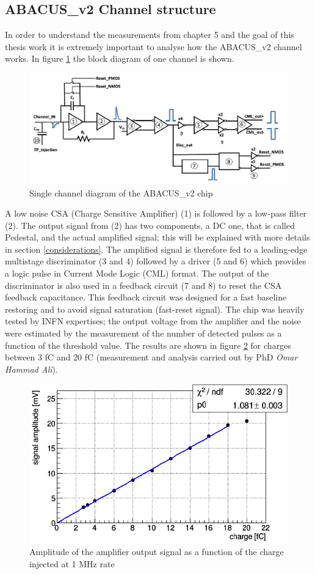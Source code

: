 \subsection{ABACUS\_v2 Channel structure}
In order to understand the measurements from chapter 5 and the goal of this thesis work it is extremely important to analyse how the ABACUS\_v2 channel works.
In figure \ref{fig:abacuschannel} the block diagram of one channel is shown.
\begin{figure}[H]
	\centering
	\includegraphics[width=0.8\linewidth]{IMG/ch2/Abacus_channel.png}
	\caption{Single channel diagram of the ABACUS\_v2 chip}
	\label{fig:abacuschannel}
\end{figure}
\noindent A low noise CSA (Charge Sensitive Amplifier) (1) is followed by a low-pass filter (2).
The output signal from (2) has two components, a DC one, that is called Pedestal, and the actual amplified signal; this will be explained with more details in section \ref{considerations}.
The amplified signal is therefore fed to a leading-edge multistage discriminator (3 and 4) followed by a driver (5 and 6) which provides a logic pulse in Current Mode Logic (CML) format.
The output of the discriminator is also used in a feedback circuit (7 and 8) to reset the CSA feedback capacitance. This feedback circuit was designed for a fast baseline restoring and to avoid signal saturation (fast-reset signal).
The chip was heavily tested by INFN expertises; the output voltage from the amplifier and the noise were estimated by the measurement of the number of detected pulses as a function of the threshold value. The results are shown in figure \ref{fig:abacustest} for charges between 3 fC and 20 fC (measurement and analysis carried out by PhD \textit{Omar Hammad Ali}).
\begin{figure}[H]
	\centering
	\includegraphics[width=0.6\linewidth]{IMG/ch2/ABACUSTEST}
	\caption{Amplitude of the amplifier output signal as a function of the charge injected at 1 MHz rate}
	\label{fig:abacustest}
\end{figure}
